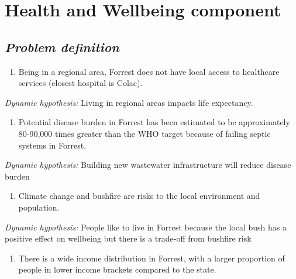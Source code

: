 \documentclass[
  11pt,
]{book}
\providecommand{\tightlist}{%
  \setlength{\itemsep}{0pt}\setlength{\parskip}{0pt}}
\begin{document}
\hypertarget{health-and-wellbeing-component}{%
\chapter{Health and Wellbeing component}\label{health-and-wellbeing-component}}

\hypertarget{problem-definition-8}{%
\section{\texorpdfstring{\emph{Problem definition}}{Problem definition}}\label{problem-definition-8}}

\begin{enumerate}
\def\labelenumi{\arabic{enumi}.}
\tightlist
\item
  Being in a regional area, Forrest does not have local access to healthcare services (closest hospital is Colac).
\end{enumerate}

\emph{Dynamic hypothesis:}
Living in regional areas impacts life expectancy.

\begin{enumerate}
\def\labelenumi{\arabic{enumi}.}
\setcounter{enumi}{1}
\tightlist
\item
  Potential disease burden in Forrest has been estimated to be approximately 80-90,000 times greater than the WHO target because of failing septic systems in Forrest.
\end{enumerate}

\emph{Dynamic hypothesis:}
Building new wastewater infrastructure will reduce disease burden

\begin{enumerate}
\def\labelenumi{\arabic{enumi}.}
\setcounter{enumi}{2}
\tightlist
\item
  Climate change and bushfire are risks to the local environment and population.
\end{enumerate}

\emph{Dynamic hypothesis:}
People like to live in Forrest because the local bush has a positive effect on wellbeing but there is a trade-off from bushfire risk

\begin{enumerate}
\def\labelenumi{\arabic{enumi}.}
\setcounter{enumi}{3}
\tightlist
\item
  There is a wide income distribution in Forrest, with a larger proportion of people in lower income brackets compared to the state.
\end{enumerate}
\end{document}
